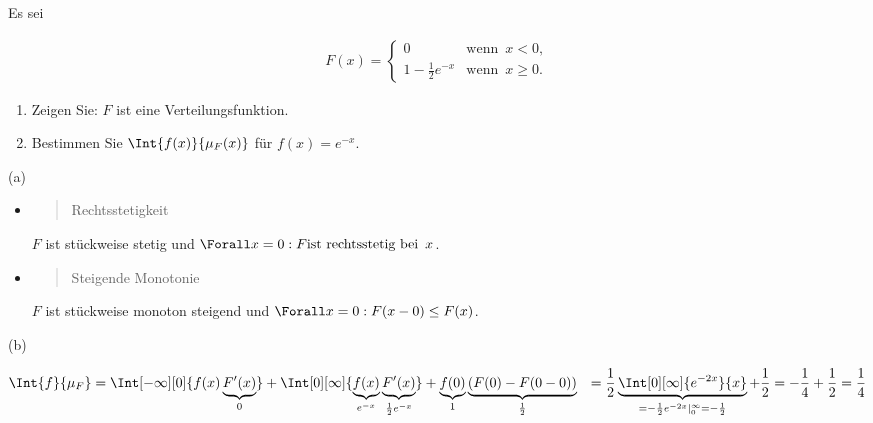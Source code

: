 
\begin{exercise}

Es sei

\begin{align*}
  F(x) =
  \begin{cases}
    0                       & \text{wenn} \enspace x < 0, \\
    1 - \frac{1}{2} e^{-x}  & \text{wenn} \enspace x \geq 0.
  \end{cases}
\end{align*}

\begin{enumerate}[label = (\alph*)]

  \item
  Zeigen Sie: $F$ ist eine Verteilungsfunktion.
  
  \item
  Bestimmen Sie $\Int{f(x)}{\mu_F(x)}$ für $f(x) = e^{-x}$.

\end{enumerate}

\end{exercise}


\begin{solution}

(a) \phantom{}

\begin{itemize}

  \item \blockquote{Rechtsstetigkeit}: $F$ ist stückweise stetig und $\Forall x = 0: F \text{ist rechtsstetig bei} \enspace x$.

  \item \blockquote{Steigende Monotonie}: $F$ ist stückweise monoton steigend und $\Forall x = 0: F(x - 0) \leq F(x)$.

\end{itemize}

(b)

\begin{align*}
  \Int{f}{\mu_F}
  & =
  \Int[-\infty][0]{f(x) \underbrace{F^\prime(x)}_0}
  +
  \Int[0][\infty]
  {
    \underbrace{f(x)}_{e^{-x}}
    \underbrace{F^\prime(x)}_{\frac{1}{2} e^{-x}}
  }
  +
  \underbrace{f(0)}_1 \underbrace{(F(0) - F(0 - 0))}_\frac{1}{2}
  & =
  \frac{1}{2} \underbrace
  {
    \Int[0][\infty]{e^{-2x}}{x}
  }_{
    = -\frac{1}{2} e^{-2x} |_0^\infty
    = -\frac{1}{2}
  }
  +
  \frac{1}{2}
  =
  -\frac{1}{4} + \frac{1}{2} = \frac{1}{4}
\end{align*}

\end{solution}

